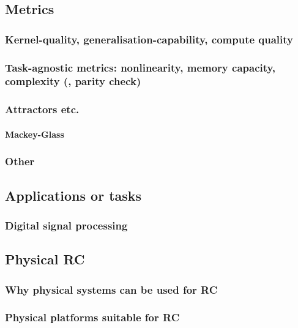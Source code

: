 \subsection{Metrics} \label{sec:1:RC_metrics}
\subsubsection{Kernel-quality, generalisation-capability, compute quality} \label{sec:1:RC_metrics_KQ}
\subsubsection{Task-agnostic metrics: nonlinearity, memory capacity, complexity (, parity check)}
\subsubsection{Attractors etc.} %
\paragraph{Mackey-Glass}
\subsubsection{Other} %
\subsection{Applications or tasks}
\subsubsection{Digital signal processing} %
\subsection{Physical RC}
\subsubsection{Why physical systems can be used for RC}
\subsubsection{Physical platforms suitable for RC}
